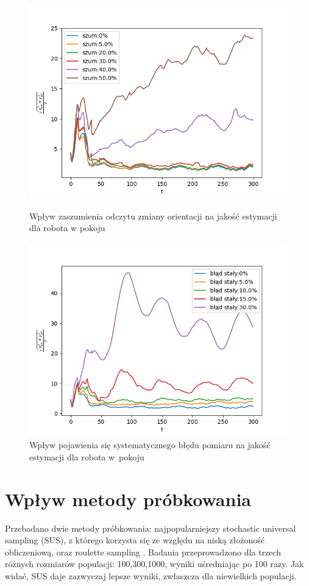 \begin{figure}[H]
	\begin{center}
		\includegraphics[width=12cm]{./wplyw_szumu_ori.png}
		\caption{Wpływ zaszumienia odczytu zmiany orientacji na jakość estymacji dla robota w pokoju}
		\label{wplyw_szumu_ori}
	\end{center}

	\begin{center}
		\includegraphics[width=12cm]{./blad_staly.png}
		\caption{Wpływ pojawienia się systematycznego błędu pomiaru na jakość estymacji dla robota w~pokoju}
		\label{blad_staly}
	\end{center}
\end{figure}

\section{Wpływ metody próbkowania}
Przebadano dwie metody próbkowania: najpopularniejszy stochastic universal sampling \cite{sus_wiki} (SUS), z którego korzysta się ze względu na niską złożoność obliczeniową, oraz roulette sampling \cite{rou_wiki}. Badania przeprowadzono dla trzech różnych rozmiarów populacji: 100,300,1000, wyniki uśredniając po 100 razy. Jak widać, SUS daje zazwyczaj lepsze wyniki, zwłaszcza dla niewielkich populacji. 

